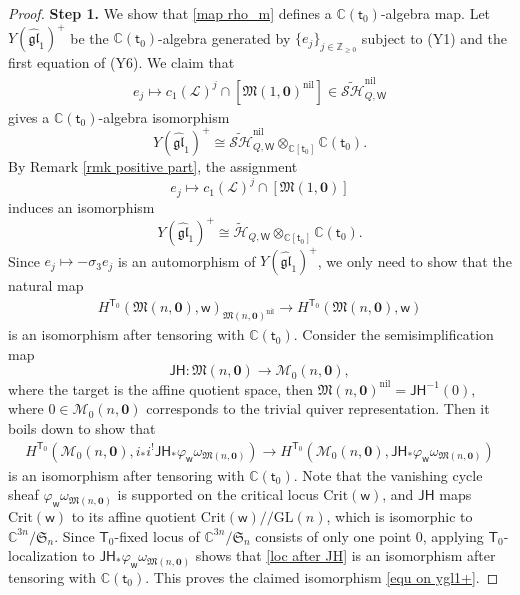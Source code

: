 \documentclass[10pt]{amsart}
\theoremstyle{definition}
\numberwithin{equation}{section}
\newcommand{\GL}{\mathrm{GL}}
\newcommand{\Crit}{\mathrm{Crit}}
\newcommand{\bC}{\mathbb{C}}
\newcommand{\bZ}{\mathbb{Z}}
\newcommand{\cM}{\mathcal{M}}
\newcommand{\fM}{\mathfrak{M}}
\newcommand{\sT}{\mathsf{T}}
\newcommand{\sW}{\mathsf{W}}
\newcommand{\sw}{\mathsf{w}}
\begin{document}
\begin{proof}
\textbf{Step 1.} We show that \eqref{map rho_m} defines a $\bC(\mathsf t_0)$-algebra map. Let $Y(\widehat{\mathfrak{gl}}_1)^+$ be the $\bC(\mathsf t_0)$-algebra generated by $\{e_j\}_{j\in \bZ_{\geqslant0}}$ subject to (Y1) and the first equation of (Y6). We claim that 
\begin{align*}
    e_j\mapsto c_1(\mathcal L)^{j}\cap [\fM(1,\mathbf 0)^{\mathrm{nil}}]\in \widetilde{\mathcal {SH}}_{Q,\sW}^{\mathrm{nil}}
\end{align*}
gives a $\bC(\mathsf t_0)$-algebra isomorphism 
\begin{equation}\label{equ on ygl1+}Y(\widehat{\mathfrak{gl}}_1)^+\cong \widetilde{\mathcal {SH}}_{Q,\sW}^{\mathrm{nil}}\otimes_{\bC[\mathsf t_0]}\bC(\mathsf t_0). \end{equation} 
By Remark \ref{rmk positive part}, the assignment 
$$e_j\mapsto c_1(\mathcal L)^{j}\cap [\fM(1,\mathbf 0)]$$ induces an isomorphism 
$$Y(\widehat{\mathfrak{gl}}_1)^+\cong \widetilde{\mathcal {H}}_{Q,\sW}\otimes_{\bC[\mathsf t_0]}\bC(\mathsf t_0). $$ 
Since $e_j\mapsto -\sigma_3e_j$ is an automorphism of $Y(\widehat{\mathfrak{gl}}_1)^+$, we only need to show that the natural map
\begin{align*}
    H^{\sT_0}(\fM(n,\mathbf 0),\sw)_{\fM(n,\mathbf 0)^{\mathrm{nil}}}\to H^{\sT_0}(\fM(n,\mathbf 0),\sw)
\end{align*}
is an isomorphism after tensoring with $\bC(\mathsf t_0)$. Consider the semisimplification map 
$$\mathsf{JH}\colon \fM(n,\mathbf 0)\to \cM_0(n,\mathbf 0),$$ 
where the target is the affine quotient space, then $\fM(n,\mathbf 0)^{\mathrm{nil}}=\mathsf{JH}^{-1}(0)$, where $0\in \cM_0(n,\mathbf 0)$ corresponds to the trivial quiver representation. Then it boils down to show that
\begin{align}\label{loc after JH}
    H^{\sT_0}(\cM_0(n,\mathbf 0),i_*i^!\mathsf{JH}_*\varphi_\sw\omega_{\fM(n,\mathbf 0)})\to H^{\sT_0}(\cM_0(n,\mathbf 0),\mathsf{JH}_*\varphi_\sw\omega_{\fM(n,\mathbf 0)})
\end{align}
is an isomorphism after tensoring with $\bC(\mathsf t_0)$. Note that the vanishing cycle sheaf $\varphi_\sw\omega_{\fM(n,\mathbf 0)}$ is supported on the critical locus $\Crit(\sw)$, and $\mathsf{JH}$ maps $\Crit(\sw)$ to its affine quotient $\Crit(\sw)/\!\!/ \GL(n)$, which is isomorphic to $\bC^{3n}/\mathfrak{S}_n$. Since $\sT_0$-fixed locus of $\bC^{3n}/\mathfrak{S}_n$ consists of only one point $0$, applying $\sT_0$-localization to $\mathsf{JH}_*\varphi_\sw\omega_{\fM(n,\mathbf 0)}$ shows that \eqref{loc after JH} is an isomorphism after tensoring with $\bC(\mathsf t_0)$. This proves the claimed isomorphism \eqref{equ on ygl1+}.


\end{proof}
\end{document}
